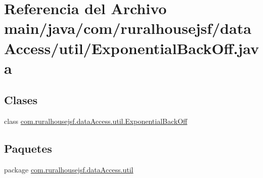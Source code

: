 \hypertarget{a00023}{}\section{Referencia del Archivo main/java/com/ruralhousejsf/data\+Access/util/\+Exponential\+Back\+Off.java}
\label{a00023}
\subsection*{Clases}
\begin{DoxyCompactItemize}
\item 
class \mbox{\hyperlink{a00156}{com.\+ruralhousejsf.\+data\+Access.\+util.\+Exponential\+Back\+Off}}
\end{DoxyCompactItemize}
\subsection*{Paquetes}
\begin{DoxyCompactItemize}
\item 
package \mbox{\hyperlink{a00113}{com.\+ruralhousejsf.\+data\+Access.\+util}}
\end{DoxyCompactItemize}
